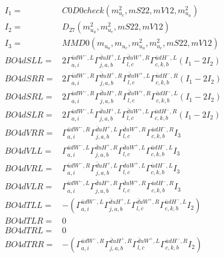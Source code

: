 \documentclass[A4,landscape]{article}
\begin{document}
\begin{align} 
I_1 = & C0D0check(m^2_{u_{{c}}}, mS22, mV12, m^2_{u_{{a}}}) \\ 
I_2 = & D_{27}(m^2_{u_{{a}}}, m^2_{u_{{c}}}, mS22, mV12) \\ 
I_3 = & MMD0(m_{u_{{a}}}, m_{u_{{c}}}, m^2_{u_{{a}}}, m^2_{u_{{c}}}, mS22, mV12) \\ 
  BO4dSLL= & 2  \Gamma^{\bar{u}d W^-,L}_{a, i} \Gamma^{\bar{d}u H^+,L}_{j, a, b} \Gamma^{\bar{d}u W^+ ,R}_{l, c} \Gamma^{\bar{u}d H^- ,L}_{c, k, b} (I_1 - 2 I_2) \\ 
  BO4dSRR= & 2  \Gamma^{\bar{u}d W^-,R}_{a, i} \Gamma^{\bar{d}u H^+,R}_{j, a, b} \Gamma^{\bar{d}u W^+ ,L}_{l, c} \Gamma^{\bar{u}d H^- ,R}_{c, k, b} (I_1 - 2 I_2) \\ 
  BO4dSRL= & 2  \Gamma^{\bar{u}d W^-,R}_{a, i} \Gamma^{\bar{d}u H^+,R}_{j, a, b} \Gamma^{\bar{d}u W^+ ,R}_{l, c} \Gamma^{\bar{u}d H^- ,L}_{c, k, b} (I_1 - 2 I_2) \\ 
  BO4dSLR= & 2  \Gamma^{\bar{u}d W^-,L}_{a, i} \Gamma^{\bar{d}u H^+,L}_{j, a, b} \Gamma^{\bar{d}u W^+ ,L}_{l, c} \Gamma^{\bar{u}d H^- ,R}_{c, k, b} (I_1 - 2 I_2) \\ 
  BO4dVRR= &  \Gamma^{\bar{u}d W^-,R}_{a, i} \Gamma^{\bar{d}u H^+,L}_{j, a, b} \Gamma^{\bar{d}u W^+ ,R}_{l, c} \Gamma^{\bar{u}d H^- ,R}_{c, k, b} I_3 \\ 
  BO4dVLL= &  \Gamma^{\bar{u}d W^-,L}_{a, i} \Gamma^{\bar{d}u H^+,R}_{j, a, b} \Gamma^{\bar{d}u W^+ ,L}_{l, c} \Gamma^{\bar{u}d H^- ,L}_{c, k, b} I_3 \\ 
  BO4dVRL= &  \Gamma^{\bar{u}d W^-,R}_{a, i} \Gamma^{\bar{d}u H^+,L}_{j, a, b} \Gamma^{\bar{d}u W^+ ,L}_{l, c} \Gamma^{\bar{u}d H^- ,L}_{c, k, b} I_3 \\ 
  BO4dVLR= &  \Gamma^{\bar{u}d W^-,L}_{a, i} \Gamma^{\bar{d}u H^+,R}_{j, a, b} \Gamma^{\bar{d}u W^+ ,R}_{l, c} \Gamma^{\bar{u}d H^- ,R}_{c, k, b} I_3 \\ 
  BO4dTLL= & -( \Gamma^{\bar{u}d W^-,L}_{a, i} \Gamma^{\bar{d}u H^+,L}_{j, a, b} \Gamma^{\bar{d}u W^+ ,R}_{l, c} \Gamma^{\bar{u}d H^- ,L}_{c, k, b} I_2) \\ 
  BO4dTLR= & 0 \\ 
  BO4dTRL= & 0 \\ 
  BO4dTRR= & -( \Gamma^{\bar{u}d W^-,R}_{a, i} \Gamma^{\bar{d}u H^+,R}_{j, a, b} \Gamma^{\bar{d}u W^+ ,L}_{l, c} \Gamma^{\bar{u}d H^- ,R}_{c, k, b} I_2) \\ 
\end{align} 
\end{document}
